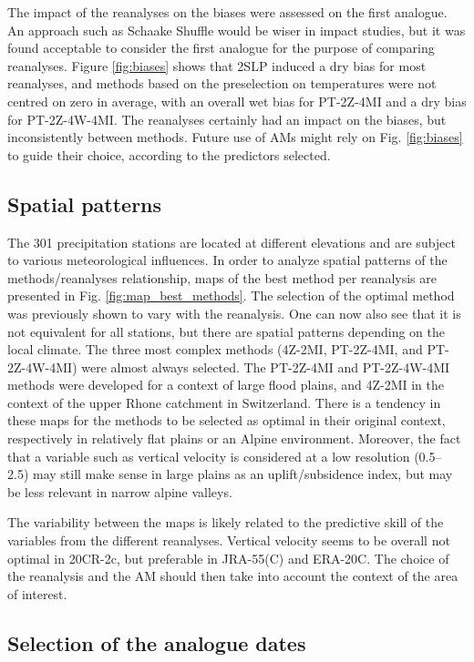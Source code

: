 \documentclass{ametsoc}
\begin{document}
The impact of the reanalyses on the biases were assessed on the first analogue. An approach such as Schaake Shuffle \citep{Clark2004a} would be wiser in impact studies, but it was found acceptable to consider the first analogue for the purpose of comparing reanalyses. Figure \ref{fig:biases} shows that 2SLP induced a dry bias for most reanalyses, and methods based on the preselection on temperatures were not centred on zero in average, with an overall wet bias for PT-2Z-4MI and a dry bias for PT-2Z-4W-4MI. The reanalyses certainly had an impact on the biases, but inconsistently between methods. Future use of AMs might rely on Fig. \ref{fig:biases} to guide their choice, according to the predictors selected.


\subsection{Spatial patterns}

The 301 precipitation stations are located at different elevations and are subject to various meteorological influences. In order to analyze spatial patterns of the methods/reanalyses relationship, maps of the best method per reanalysis are presented in Fig. \ref{fig:map_best_methods}. The selection of the optimal method was previously shown to vary with the reanalysis. One can now also see that it is not equivalent for all stations, but there are spatial patterns depending on the local climate. The three most complex methods (4Z-2MI, PT-2Z-4MI, and PT-2Z-4W-4MI) were almost always selected. The PT-2Z-4MI and PT-2Z-4W-4MI methods were developed for a context of large flood plains, and 4Z-2MI in the context of the upper Rhone catchment in Switzerland. There is a tendency in these maps for the methods to be selected as optimal in their original context, respectively in relatively flat plains or an Alpine environment. Moreover, the fact that a variable such as vertical velocity is considered at a low resolution (0.5\degree -- 2.5\degree) may still make sense in large plains as an uplift/subsidence index, but may be less relevant in narrow alpine valleys. 

The variability between the maps is likely related to the predictive skill of the variables from the different reanalyses. Vertical velocity seems to be overall not optimal in 20CR-2c, but preferable in JRA-55(C) and ERA-20C. The choice of the reanalysis and the AM should then take into account the context of the area of interest.


\subsection{Selection of the analogue dates}
\end{document}
